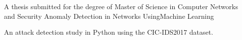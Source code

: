 
\begin{cventries}
  \cventry
    {A thesis submitted for the degree of Master of Science in Computer Networks and Security} %
    {Anomaly Detection in Networks UsingMachine Learning} %
    {} %
    {} %
    {
      \begin{cvitems} %
        \item {An attack detection study in Python using the CIC-IDS2017 dataset.~\href{https://github.com/kahramankostas/Anomaly-Detection-in-Networks-Using-Machine-Learning}{\faGithub}~\href{https://github.com/kahramankostas/Anomaly-Detection-in-Networks-Using-Machine-Learning/blob/master/Anomaly_Detection_in_Networks_Using_Machine_Learning.pdf}{\faExternalLink} }
      \end{cvitems}
    }


\end{cventries}